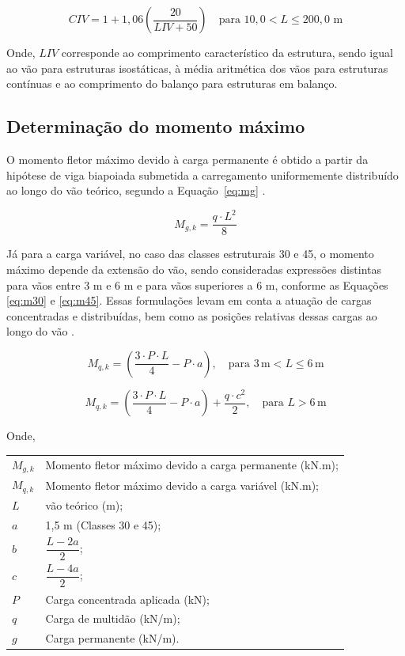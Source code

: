 \begin{equation}
CIV = 1 + 1{,}06 \left( \frac{20}{LIV + 50} \right)
\quad \text{para } 10{,}0 < L \leq 200{,}0 \text{ m}
\label{eq:CIVmaior}
\end{equation}

Onde, $LIV$ corresponde ao comprimento característico da estrutura, sendo igual ao vão para estruturas isostáticas, à média aritmética dos vãos para estruturas contínuas e ao comprimento do balanço para estruturas em balanço.

\subsection{Determinação do momento máximo}

O momento fletor máximo devido à carga permanente é obtido a partir da hipótese de viga biapoiada submetida a carregamento uniformemente distribuído ao longo do vão teórico, segundo a Equação~\eqref{eq:mg} \parencite{CALIL2006}. 

\begin{equation}
M_{g,k} = \frac{q \cdot L^{2}}{8}
\label{eq:mg}
\end{equation}

Já para a carga variável, no caso das classes estruturais 30 e 45, o momento máximo depende da extensão do vão, sendo consideradas expressões distintas para vãos entre 3 m e 6 m e para vãos superiores a 6 m, conforme as Equações \eqref{eq:m30} e \eqref{eq:m45}. Essas formulações levam em conta a atuação de cargas concentradas e distribuídas, bem como as posições relativas dessas cargas ao longo do vão \parencite{CALIL2006}.

\begin{equation}
M_{q,k} = \left( \frac{3 \cdot P \cdot L}{4} - P \cdot a \right),
\quad \text{para } 3\,\text{m} < L \leq 6\,\text{m}
\label{eq:m30}
\end{equation}

\begin{equation}
M_{q,k} = \left( \frac{3 \cdot P \cdot L}{4} - P \cdot a \right) + \frac{q \cdot c^{2}}{2},
\quad \text{para } L > 6\,\text{m}
\label{eq:m45}
\end{equation}

Onde,


\begin{tabular}{ll}
$M_{g,k}$ & Momento fletor máximo devido a carga permanente (kN.m);\\
$M_{q,k}$ & Momento fletor máximo devido a carga variável (kN.m);\\
$L$ & vão teórico (m);\\
$a$ & 1,5 m (Classes 30 e 45);\\
$b$ & $\dfrac{L-2a}{2}$;\\
$c$ & $\dfrac{L-4a}{2}$;\\
$P$ & Carga concentrada aplicada (kN);\\
$q$ & Carga de multidão (kN/m);\\
$g$ & Carga permanente (kN/m).
\end{tabular}

